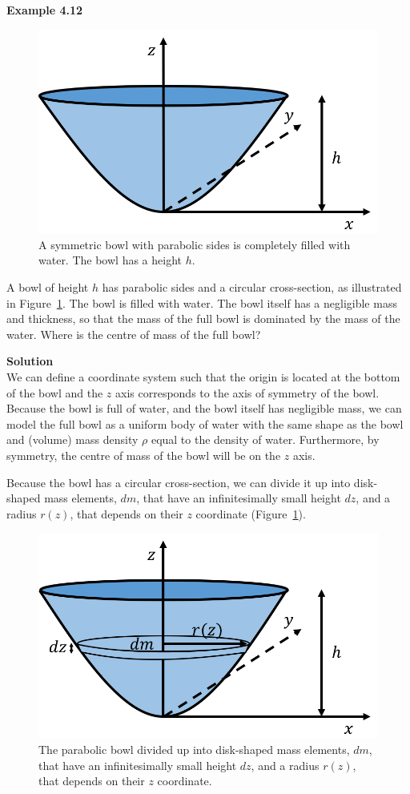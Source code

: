 \documentclass[9pt,arxiv,red]{lapreprint}
\begin{document}
\begin{framed}
\textbf{Example 4.12}\\
\begin{figure}[!htbp]
\centering
\includegraphics[width=0.5\linewidth]{files/cmbowl-1d1b369d890b85728f882628aa960aeb.png}
\caption[]{A symmetric bowl with parabolic sides is completely filled with water. The bowl has a height $h$.}
\label{fig:momentumandcm:cmbowl}
\end{figure}

A bowl of height $h$ has parabolic sides and a circular cross-section, as illustrated in Figure~\ref{fig:momentumandcm:cmbowl}. The bowl is filled with water. The bowl itself has a negligible mass and thickness, so that the mass of the full bowl is dominated by the mass of the water. Where is the centre of mass of the full bowl?

\begin{framed}
\textbf{Solution}\\
We can define a coordinate system such that the origin is located at the bottom of the bowl and the $z$ axis corresponds to the axis of symmetry of the bowl. Because the bowl is full of water, and the bowl itself has negligible mass, we can model the full bowl as a uniform body of water with the same shape as the bowl and (volume) mass density $\rho$ equal to the density of water. Furthermore, by symmetry, the centre of mass of the bowl will be on the $z$ axis.

Because the bowl has a circular cross-section, we can divide it up into disk-shaped mass elements, $dm$, that have an infinitesimally small height $dz$, and a radius $r(z)$, that depends on their $z$ coordinate (Figure~\ref{fig:momentumandcm:cmbowl}).

\begin{figure}[!htbp]
\centering
\includegraphics[width=0.5\linewidth]{files/cmbowlsoln-46d95246606d9afbfcb46d896208050a.png}
\caption[]{The parabolic bowl divided up into disk-shaped mass elements, $dm$, that have an infinitesimally small height $dz$, and a radius $r(z)$, that depends on their $z$ coordinate.}
\label{fig:momentumandcm:cmbowlsoln}
\end{figure}


\end{framed}
\end{framed}
\end{document}
